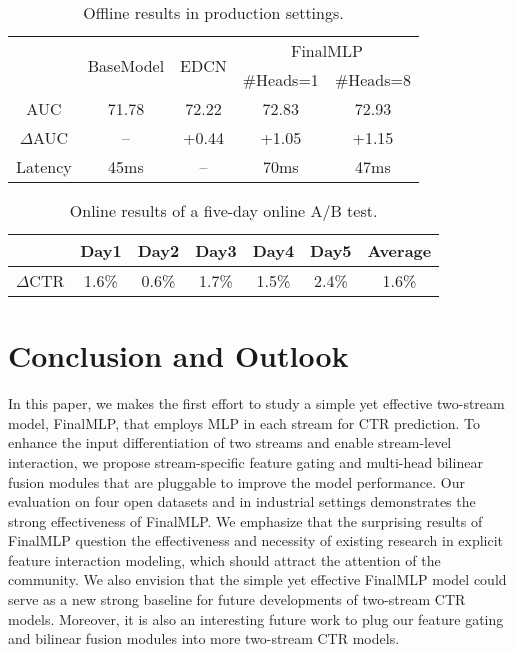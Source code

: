 \documentclass[letterpaper]{article} \usepackage{aaai23}  \usepackage{times}  \usepackage{helvet}  \usepackage{courier}  \usepackage[hyphens]{url}  \usepackage{graphicx} \urlstyle{rm} \def\UrlFont{\rm}  \usepackage{natbib}  \usepackage{caption} \frenchspacing  \setlength{\pdfpagewidth}{8.5in}  \setlength{\pdfpageheight}{11in}  \usepackage{algorithm}
\begin{document}
\begin{table}[!t]
    \small
    \renewcommand\arraystretch{1.15}
    \centering
    \caption{Offline results in production settings.}
    \begin{tabular}{c|c|c|c|c}
    \toprule
\multirow{2}{*}{} & \multirow{2}{*}{BaseModel} & \multirow{2}{*}{EDCN} & \multicolumn{2}{c}{FinalMLP} \\
                  &                            &                       & \multicolumn{1}{c}{\#Heads=1}      & \#Heads=8      \\ \midrule
        AUC & 71.78 & 72.22 & 72.83 & 72.93 \\ 
        $\Delta$AUC & -- & +0.44 & +1.05 & +1.15 \\\hline
        Latency & 45ms & -- & 70ms & 47ms \\\bottomrule
    \end{tabular}\label{tab:offline} 
\end{table}

\begin{table}[!t]
    \small
    \centering
    \caption{Online results of a five-day online A/B test.}
    \begin{tabular}{ccccccc}
    \toprule
         & Day1 & Day2 & Day3 & Day4 & Day5 & Average \\ \midrule
        $\Delta$CTR & 1.6\% & 0.6\% & 1.7\% & 1.5\% & 2.4\% & 1.6\% \\ \bottomrule
    \end{tabular}
    \label{tab:online_test} 
    \vspace{-1ex}
\end{table}



 \section{Conclusion and Outlook}
In this paper, we makes the first effort to study a simple yet effective two-stream model, FinalMLP, that employs MLP in each stream for CTR prediction. To enhance the input differentiation of two streams and enable stream-level interaction, we propose stream-specific feature gating and multi-head bilinear fusion modules that are pluggable to improve the model performance. Our evaluation on four open datasets and in industrial settings demonstrates the strong effectiveness of FinalMLP. We emphasize that the surprising results of FinalMLP question the effectiveness and necessity of existing research in explicit feature interaction modeling, which should attract the attention of the community. We also envision that the simple yet effective FinalMLP model could serve as a new strong baseline for future developments of two-stream CTR models. Moreover, it is also an interesting future work to plug our feature gating and bilinear fusion modules into more two-stream CTR models. 
\end{document}
